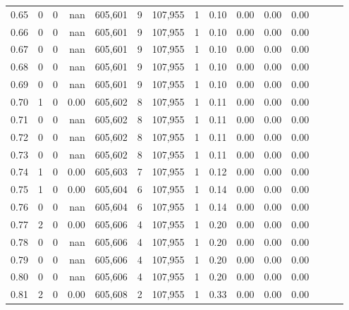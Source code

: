 \begin{tabular}{rrrrrrrrrrrrrrr}
0.65 &        0 &       0 &   nan &  605,601 &        9 &  107,955 &        1 &  0.10 &  0.00 &  0.00 &      0.00 \\
0.66 &        0 &       0 &   nan &  605,601 &        9 &  107,955 &        1 &  0.10 &  0.00 &  0.00 &      0.00 \\
0.67 &        0 &       0 &   nan &  605,601 &        9 &  107,955 &        1 &  0.10 &  0.00 &  0.00 &      0.00 \\
0.68 &        0 &       0 &   nan &  605,601 &        9 &  107,955 &        1 &  0.10 &  0.00 &  0.00 &      0.00 \\
0.69 &        0 &       0 &   nan &  605,601 &        9 &  107,955 &        1 &  0.10 &  0.00 &  0.00 &      0.00 \\
0.70 &        1 &       0 &  0.00 &  605,602 &        8 &  107,955 &        1 &  0.11 &  0.00 &  0.00 &      0.00 \\
0.71 &        0 &       0 &   nan &  605,602 &        8 &  107,955 &        1 &  0.11 &  0.00 &  0.00 &      0.00 \\
0.72 &        0 &       0 &   nan &  605,602 &        8 &  107,955 &        1 &  0.11 &  0.00 &  0.00 &      0.00 \\
0.73 &        0 &       0 &   nan &  605,602 &        8 &  107,955 &        1 &  0.11 &  0.00 &  0.00 &      0.00 \\
0.74 &        1 &       0 &  0.00 &  605,603 &        7 &  107,955 &        1 &  0.12 &  0.00 &  0.00 &      0.00 \\
0.75 &        1 &       0 &  0.00 &  605,604 &        6 &  107,955 &        1 &  0.14 &  0.00 &  0.00 &      0.00 \\
0.76 &        0 &       0 &   nan &  605,604 &        6 &  107,955 &        1 &  0.14 &  0.00 &  0.00 &      0.00 \\
0.77 &        2 &       0 &  0.00 &  605,606 &        4 &  107,955 &        1 &  0.20 &  0.00 &  0.00 &      0.00 \\
0.78 &        0 &       0 &   nan &  605,606 &        4 &  107,955 &        1 &  0.20 &  0.00 &  0.00 &      0.00 \\
0.79 &        0 &       0 &   nan &  605,606 &        4 &  107,955 &        1 &  0.20 &  0.00 &  0.00 &      0.00 \\
0.80 &        0 &       0 &   nan &  605,606 &        4 &  107,955 &        1 &  0.20 &  0.00 &  0.00 &      0.00 \\
0.81 &        2 &       0 &  0.00 &  605,608 &        2 &  107,955 &        1 &  0.33 &  0.00 &  0.00 &      0.00 \\

\end{tabular}
